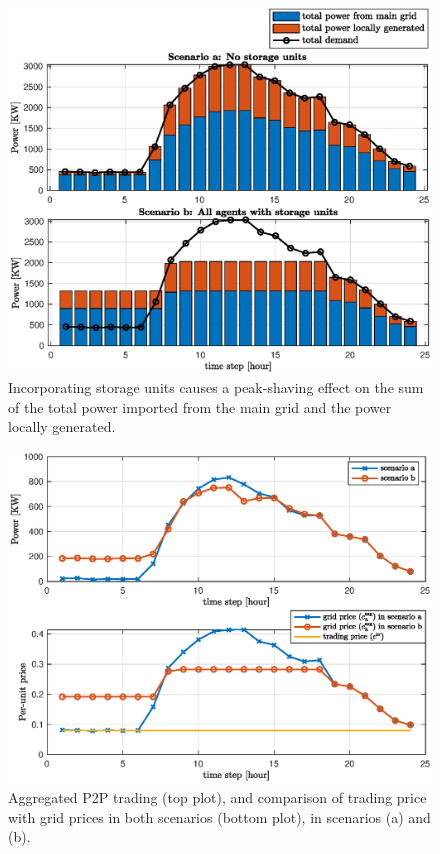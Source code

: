 \documentclass{IEEEtran}  %
\newcommand{\0}{\mathbf{0}}
\newcommand{\1}{\mathbf{1}}
\newcommand{\note}[1]{\textcolor{blue}{\texttt{#1}}}
\begin{document}
\begin{figure}[t]
	\centering\marginnote{\note{R3-6}} 
	\includegraphics[width=1\linewidth]{figures/simB_0402_pt1_v3}
	\caption{	Incorporating storage units causes a peak-shaving effect on the sum of the total power imported from the main grid and the power locally generated.}
	\label{fig:sim_B1}
\end{figure}
\begin{figure}[t]
	\includegraphics[width=1\linewidth]{figures/simB_0402_pt2_v5}
	\caption{Aggregated P2P trading (top plot), and comparison of trading price with grid prices in both scenarios (bottom plot), 
		in scenarios (a) and (b).
	}
	\label{fig:sim_B2}
\end{figure}  
\end{document}
